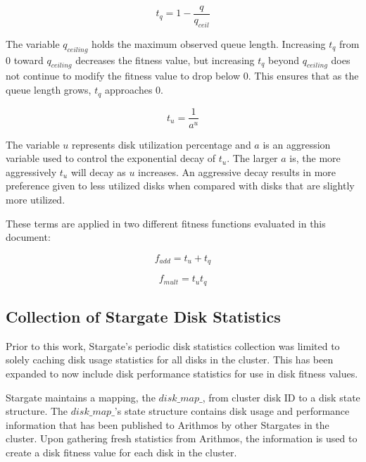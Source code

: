 \documentclass[12pt]{article}
\begin{document}
  \begin{equation}
    t_{q} = 1 - \frac{q}{q_{ceil}}
  \end{equation}

  The variable $q_{ceiling}$ holds the maximum observed queue length.
  Increasing $t_{q}$ from 0 toward $q_{ceiling}$ decreases the fitness value,
  but increasing $t_{q}$ beyond $q_{ceiling}$ does not continue to modify the
  fitness value to drop below 0. This ensures that as the queue length grows,
  $t_{q}$ approaches 0. 

  \begin{equation}
    t_{u} = \frac{1}{a^{u}}
  \end{equation}

  The variable $u$ represents disk utilization percentage and $a$ is an
  aggression variable used to control the exponential decay of $t_{u}$. The
  larger $a$ is, the more aggressively $t_{u}$ will decay as $u$ increases. An
  aggressive decay results in more preference given to less utilized disks when
  compared with disks that are slightly more utilized.

  These terms are applied in two different fitness functions evaluated in this
  document:

  \begin{equation} \label{eqn:additive-fitness}
    f_{add} = t_{u} + t_{q}
  \end{equation}

  \begin{equation} \label{eqn:multiplicative-fitness}
    f_{mult} = t_{u}t_{q}
  \end{equation}


  \subsection{Collection of Stargate Disk Statistics }

  Prior to this work, Stargate's periodic disk statistics collection was
  limited to solely caching disk usage statistics for all disks in the cluster.
  This has been expanded to now include disk performance statistics for use in
  disk fitness values.

  Stargate maintains a mapping, the $disk\_map\_$,
  from cluster disk ID to a disk state structure. The $disk\_map\_$'s state
  structure contains disk usage and performance information that has been
  published to Arithmos by other Stargates in the cluster. Upon gathering fresh
  statistics from Arithmos, the information is used to create a disk fitness value
  for each disk in the cluster.
\end{document}
